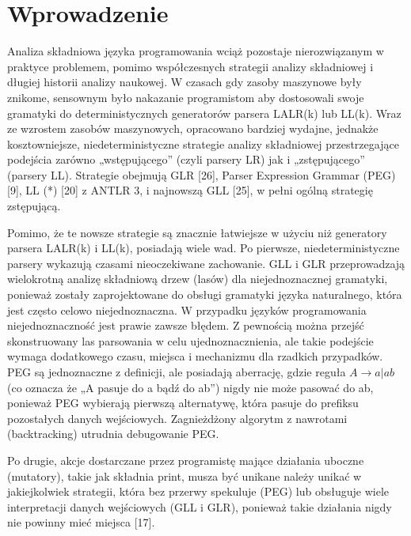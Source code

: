 \section{Wprowadzenie}
Analiza składniowa języka programowania wciąż pozostaje nierozwiązanym w praktyce problemem,
pomimo współczesnych strategii analizy składniowej i długiej historii analizy naukowej.
W czasach gdy zasoby maszynowe były znikome, sensownym było nakazanie programistom aby dostosowali
swoje gramatyki do deterministycznych generatorów parsera LALR(k) lub LL(k).\footnotemark[1]
Wraz ze wzrostem zasobów maszynowych, opracowano bardziej wydajne, jednakże kosztowniejsze,
niedeterministyczne strategie analizy składniowej przestrzegające podejścia zarówno „wstępującego”
(czyli parsery LR) jak i „zstępującego” (parsery LL).
Strategie obejmują GLR [26], Parser Expression Grammar (PEG) [9], LL (*) [20] z ANTLR 3,
i najnowszą GLL [25], w pełni ogólną strategię zstępującą.
\par
Pomimo, że te nowsze strategie są znacznie łatwiejsze w użyciu niż generatory parsera LALR(k) i LL(k),
posiadają wiele wad.
Po pierwsze, niedeterministyczne parsery wykazują czasami nieoczekiwane zachowanie.
GLL i GLR przeprowadzają wielokrotną analizę składniową drzew (lasów) dla niejednoznacznej gramatyki,
ponieważ zostały zaprojektowane do obsługi gramatyki języka naturalnego,
która jest często celowo niejednoznaczna.
W przypadku języków programowania niejednoznaczność jest prawie zawsze błędem.
Z pewnością można przejść skonstruowany las parsowania w celu ujednoznacznienia,
ale takie podejście wymaga dodatkowego czasu, miejsca i mechanizmu dla rzadkich przypadków. 
PEG są jednoznaczne z definicji, ale posiadają aberrację, gdzie reguła \(A \rightarrow a | ab\)
(co oznacza że „A pasuje do a bądź do ab”) nigdy nie może pasować do ab, ponieważ
PEG wybierają pierwszą alternatywę, która pasuje do prefiksu pozostałych danych wejściowych.
Zagnieżdżony algorytm z nawrotami (backtracking) utrudnia debugowanie PEG. 
\par
Po drugie, akcje dostarczane przez programistę mające działania uboczne (mutatory),
takie jak składnia print, musza być unikane należy unikać w jakiejkolwiek strategii,
która bez przerwy spekuluje (PEG) lub obsługuje wiele interpretacji danych wejściowych
(GLL i GLR), ponieważ takie działania nigdy nie powinny mieć miejsca [17].
